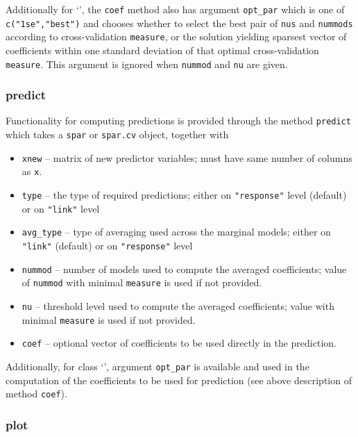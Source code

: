 \documentclass[
  article]{jss}
\newcommand{\class}[1]{`\code{#1}'}
\begin{document}
Additionally for \class{spar.cv}, the \texttt{coef} method also has
argument \texttt{opt\_par} which is one of \texttt{c("1se","best")} and
chooses whether to select the best pair of \texttt{nus} and
\texttt{nummods} according to cross-validation \texttt{measure}, or the
solution yielding sparsest vector of coefficients within one standard
deviation of that optimal cross-validation \texttt{measure}. This
argument is ignored when \texttt{nummod} and \texttt{nu} are given.

\subsubsection{predict}\label{predict}

Functionality for computing predictions is provided through the method
\texttt{predict} which takes a \texttt{spar} or \texttt{spar.cv} object,
together with

\begin{itemize}
\item
  \texttt{xnew} -- matrix of new predictor variables; must have same
  number of columns as \texttt{x}.
\item
  \texttt{type} -- the type of required predictions; either on
  \texttt{"response"} level (default) or on \texttt{"link"} level
\item
  \texttt{avg\_type} -- type of averaging used across the marginal
  models; either on \texttt{"link"} (default) or on \texttt{"response"}
  level
\item
  \texttt{nummod} -- number of models used to compute the averaged
  coefficients; value of \texttt{nummod} with minimal \texttt{measure}
  is used if not provided.
\item
  \texttt{nu} -- threshold level used to compute the averaged
  coefficients; value with minimal \texttt{measure} is used if not
  provided.
\item
  \texttt{coef} -- optional vector of coefficients to be used directly
  in the prediction.
\end{itemize}

Additionally, for class \class{spar.cv}, argument \texttt{opt\_par} is
available and used in the computation of the coefficients to be used for
prediction (see above description of method \texttt{coef}).

\subsubsection{plot}\label{plot}
\end{document}
